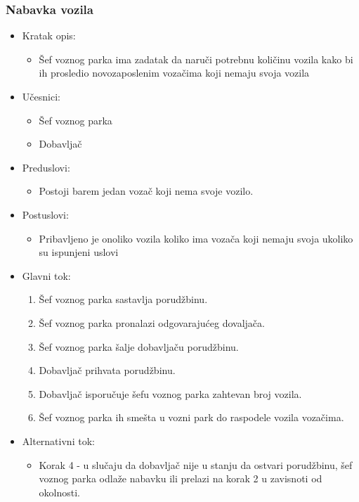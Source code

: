 \subsubsection{\bfseries Nabavka vozila}

\begin{itemize}
	\item Kratak opis:
		\begin{itemize}
			\item Šef voznog parka ima zadatak da naruči potrebnu količinu vozila kako bi ih prosledio novozaposlenim vozačima koji nemaju svoja vozila
		\end{itemize}
	\item Učesnici:
		\begin{itemize}
		    \item Šef voznog parka
			\item Dobavljač
		\end{itemize}
	\item Preduslovi:
		\begin{itemize}
		    \item Postoji barem jedan vozač koji nema svoje vozilo.
		\end{itemize}
	\item Postuslovi:
		\begin{itemize}
			\item Pribavljeno je onoliko vozila koliko ima vozača koji nemaju svoja ukoliko su ispunjeni uslovi
	\end{itemize}
	\item Glavni tok:
		\begin{enumerate}
		    \item Šef voznog parka sastavlja porudžbinu.
		    \item Šef voznog parka pronalazi odgovarajućeg dovaljača.
			\item Šef voznog parka šalje dobavljaču porudžbinu.
			\item Dobavljač prihvata porudžbinu.
			\item Dobavljač isporučuje šefu voznog parka zahtevan broj vozila.
			\item Šef voznog parka ih smešta u vozni park do raspodele vozila vozačima.
		\end{enumerate}
	\item Alternativni tok:
		\begin{itemize}
		    \item Korak 4 - u slučaju da dobavljač nije u stanju da ostvari porudžbinu, šef voznog parka odlaže nabavku ili prelazi na korak 2 u zavisnoti od okolnosti.
		\end{itemize}
\end{itemize}

